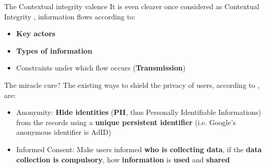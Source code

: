 \documentclass[11pt, british]{beamer}
\begin{document}
		\begin{frame}{The Contextual integrity valence}
			It is even clearer once considered as \alert{Contextual Integrity} 
			\parencite{7}, information flows according to:  
			\begin{itemize}
				\item \textbf{Key actors}
				\item \textbf{Types of information}
				\item Constraints under which flow occurs 
				(\textbf{Transmission}) 
			\end{itemize}
		\end{frame}

	
		\begin{frame}{The miracle cure?}
			The existing ways to shield the privacy of users, according to 
			\parencite{8}, are:
			\begin{itemize}
				\item \alert{Anonymity}: \textbf{Hide identities} 
				(\textbf{PII}, 
				thus  Personally Identifiable Informations) from the records 
				using a \textbf{unique persistent identifier} (i.e. Google's 
				anonymous identifier is AdID)
				\item \alert{Informed Consent}: Make users informed \textbf{who 
				is collecting data}, if the \textbf{data collection is 
				compulsory}, how \textbf{information} is \textbf{used} and 
				\textbf{shared}
			\end{itemize} 
		\end{frame}
		
\end{document}
